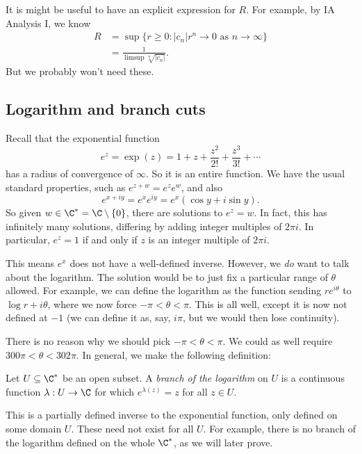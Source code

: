 \documentclass[a4paper]{article}
\begin{document}
It is might be useful to have an explicit expression for $R$. For example, by IA Analysis I, we know
\begin{align*}
  R &= \sup \{r \geq 0: |c_n|r^n \to 0\text{ as }n \to \infty\}\\
  &= \frac{1}{\limsup \sqrt[n]{|c_n|}}.
\end{align*}
But we probably won't need these.

\subsection{Logarithm and branch cuts}
Recall that the exponential function
\[
  e^z = \exp(z) = 1 + z + \frac{z^2}{2!} + \frac{z^3}{3!} + \cdots
\]
has a radius of convergence of $\infty$. So it is an entire function. We have the usual standard properties, such as $e^{z + w} = e^z e^w$, and also
\[
  e^{x + iy} = e^x e^{iy} = e^x(\cos y + i \sin y).
\]
So given $w \in \C^* = \C\setminus\{0\}$, there are solutions to $e^z = w$. In fact, this has infinitely many solutions, differing by adding integer multiples of $2\pi i$. In particular, $e^z = 1$ if and only if $z$ is an integer multiple of $2\pi i$.

This means $e^x$ does not have a well-defined inverse. However, we \emph{do} want to talk about the logarithm. The solution would be to just fix a particular range of $\theta$ allowed. For example, we can define the logarithm as the function sending $r e^{i\theta}$ to $\log r + i\theta$, where we now force $-\pi < \theta < \pi$. This is all well, except it is now not defined at $-1$ (we can define it as, say, $i \pi$, but we would then lose continuity).

There is no reason why we should pick $-\pi < \theta < \pi$. We could as well require $300 \pi < \theta < 302\pi$. In general, we make the following definition:
\begin{defi}
  Let $U \subseteq \C^*$ be an open subset. A \emph{branch of the logarithm} on $U$ is a continuous function $\lambda: U \to \C$ for which $e^{\lambda (z)} = z$ for all $z \in U$.
\end{defi}
This is a partially defined inverse to the exponential function, only defined on some domain $U$. These need not exist for all $U$. For example, there is no branch of the logarithm defined on the whole $\C^*$, as we will later prove.
\end{document}
